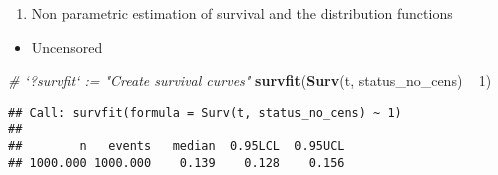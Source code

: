 \documentclass[]{book}
\newenvironment{Shaded}{\begin{snugshade}}{\end{snugshade}}
\newcommand{\KeywordTok}[1]{\textcolor[rgb]{0.13,0.29,0.53}{\textbf{{#1}}}}
\newcommand{\DecValTok}[1]{\textcolor[rgb]{0.00,0.00,0.81}{{#1}}}
\newcommand{\StringTok}[1]{\textcolor[rgb]{0.31,0.60,0.02}{{#1}}}
\newcommand{\CommentTok}[1]{\textcolor[rgb]{0.56,0.35,0.01}{\textit{{#1}}}}
\newcommand{\NormalTok}[1]{{#1}}
\providecommand{\tightlist}{%
  \setlength{\itemsep}{0pt}\setlength{\parskip}{0pt}}
\theoremstyle{definition}
\theoremstyle{definition}
\theoremstyle{definition}
\theoremstyle{remark}
\begin{document}
\begin{enumerate}
\def\labelenumi{\arabic{enumi}.}
\setcounter{enumi}{3}
\tightlist
\item
  Non parametric estimation of survival and the distribution functions
\end{enumerate}

\begin{itemize}
\tightlist
\item
  Uncensored
\end{itemize}

\begin{Shaded}
\begin{Highlighting}[]
\CommentTok{# `?survfit` := "Create survival curves"}
\KeywordTok{survfit}\NormalTok{(}\KeywordTok{Surv}\NormalTok{(t, status_no_cens) ~}\StringTok{ }\DecValTok{1}\NormalTok{)}
\end{Highlighting}
\end{Shaded}

\begin{verbatim}
## Call: survfit(formula = Surv(t, status_no_cens) ~ 1)
## 
##        n   events   median  0.95LCL  0.95UCL 
## 1000.000 1000.000    0.139    0.128    0.156
\end{verbatim}
\end{document}
